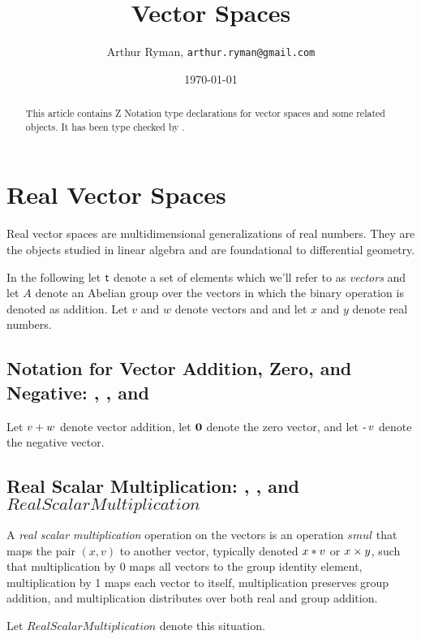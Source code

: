 \documentclass[11pt, oneside]{article}
\title{Vector Spaces}
\author{Arthur Ryman, {\tt arthur.ryman@gmail.com}}
\date{\today}
\begin{document}
\maketitle

\begin{abstract}
This article contains Z Notation type declarations for vector spaces and some related objects.
It has been type checked by \fuzz.
\end{abstract}

\tableofcontents

\section{Real Vector Spaces}

Real vector spaces are multidimensional generalizations of real numbers.
They are the objects studied in linear algebra and are foundational to differential geometry.

In the following let $\mathsf{t}$ denote a set of elements which we'll refer to as {\em vectors}
and let $A$ denote an Abelian group over the vectors in which the binary operation is denoted as addition.
Let $v$ and $w$ denote vectors and
and let $x$ and $y$ denote real numbers.

\subsection{Notation for Vector Addition, Zero, and Negative: , , and }

Let $v \mathbin{+} w$ denote vector addition,
let $\mathbf{0}$ denote the zero vector,
and let $\operatorname{-} v$ denote the negative vector.

\subsection{Real Scalar Multiplication: , , and $RealScalarMultiplication$}

A {\em real scalar multiplication} operation on the vectors is an operation $smul$ 
that maps the pair $(x, v)$ to another vector, typically denoted $x \mathbin{*} v$ or $x \mathbin{\times} y$,
such that
multiplication by 0 maps all vectors to the group identity element,
multiplication by 1 maps each vector to itself,
multiplication preserves group addition, 
and multiplication distributes over both real and group addition.

Let $RealScalarMultiplication$ denote this situation.
\end{document}
